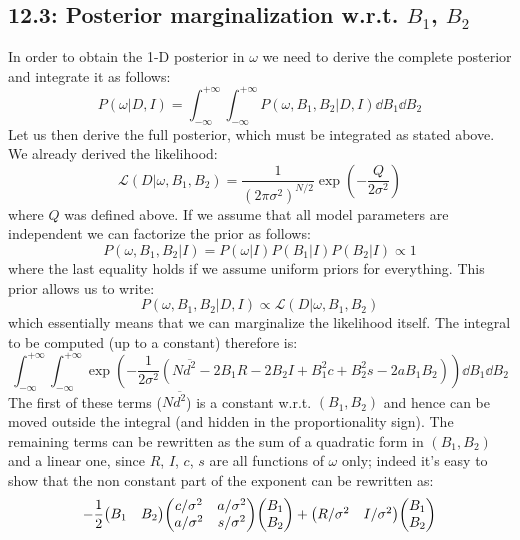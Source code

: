 \documentclass[a4paper]{article}
\newcommand{\tonde}[1]{\left( {#1} \right)}
\renewcommand{\L}{\mathcal{L}}%
\begin{document}
\subsection{12.3: Posterior marginalization w.r.t. $B_1$, $B_2$}
In order to obtain the 1-D posterior in $\omega$ we need to derive the complete posterior and integrate it as follows:
\begin{equation*}
    P(\omega | D,I) = \int_{-\infty}^{+\infty}\int_{-\infty}^{+\infty} P(\omega, B_1, B_2|D,I) \dd{B_1}\dd{B_2}
\end{equation*}
Let us then derive the full posterior, which must be integrated as stated above.\\
We already derived the likelihood:
\begin{equation*}
    \L(D|\omega, B_1, B_2) = \frac{1}{(2\pi \sigma^2)^{N/2}}\exp(-\frac{Q}{2\sigma^2})
\end{equation*}
where $Q$ was defined above. If we assume that all model parameters are independent we can factorize the prior as follows:
\begin{equation*}
    P(\omega, B_1, B_2|I) = P(\omega|I)P(B_1|I)P(B_2|I) \propto 1
\end{equation*}
where the last equality holds if we assume uniform priors for everything. This prior allows us to write:
\begin{equation*}
    P(\omega, B_1, B_2|D,I) \propto \L(D|\omega, B_1, B_2)
\end{equation*}
which essentially means that we can marginalize the likelihood itself.
The integral to be computed (up to a constant) therefore is:
\begin{equation*}
    \int_{-\infty}^{+\infty}\int_{-\infty}^{+\infty} \exp(-\frac{1}{2\sigma^2}\tonde{N\overline{d^2}-2B_1 R -2B_2 I +B_1^2c+B_2^2s - 2a B_1 B_2}) \dd{B_1}\dd{B_2}
\end{equation*}
The first of these terms ($N\overline{d^2}$) is a constant w.r.t. $(B_1,B_2)$ and hence can be moved outside the integral (and hidden in the proportionality sign). The remaining terms can be rewritten as the sum of a quadratic form in $(B_1, B_2)$ and a linear one, since $R$, $I$, $c$, $s$ are all functions of $\omega$ only; indeed it's easy to show that the non constant part of the exponent can be rewritten as:
\begin{equation*}
    -\frac{1}{2}\mqty(B_1 & B_2)\mqty(c/\sigma^2 & a/\sigma^2 \\ a/\sigma^2 & s/\sigma^2)\mqty(B_1\\B_2)+\mqty(R/\sigma^2 & I/\sigma^2)\mqty(B_1\\B_2)
\end{equation*}
\end{document}
